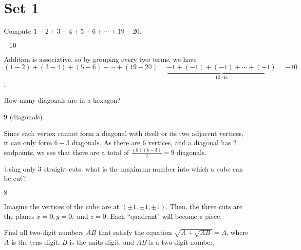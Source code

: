 \documentclass[11pt]{article}
\begin{document}
\section*{Set 1}

\begin{problem}
Compute $1 - 2 + 3 - 4 + 5 - 6 + \cdots + 19 - 20$.
\end{problem}

\begin{answer}
$\boxed{-10}$
\end{answer}

\begin{solution}
Addition is associative, so by grouping every two terms, we have $(1 - 2) + (3 - 4) + (5 - 6) + \cdots + (19 - 20) = \underbrace{-1 + (-1) + (-1) + \cdots + (-1)}_{\text{10 -1s}} = \boxed{-10}$.
\end{solution}


\begin{problem}%
How many diagonals are in a hexagon?
\end{problem}

\begin{answer}
$\boxed{9}$ (diagonals)
\end{answer}

\begin{solution}
Since each vertex cannot form a diagonal with itself or its two adjacent vertices, it can only form $6-3$ diagonals. As there are 6 vertices, and a diagonal has 2 endpoints, we see that there are a total of $\frac{(6)(6-3)}{2}=\boxed{9}$ diagonals.
\end{solution}


\begin{problem}%
Using only 3 straight cuts, what is the maximum number into which a cube can be cut?
\end{problem}

\begin{answer}
$\boxed{8}$
\end{answer}

\begin{solution}
Imagine the vertices of the cube are at $(\pm 1, \pm 1, \pm 1)$. Then, the three cuts are the planes $x=0, y=0,$ and $z=0$. Each ``quadrant" will become a piece.
\end{solution}


\begin{problem}%
Find all two-digit numbers $\underline{AB}$ that satisfy the equation $\sqrt{A + \sqrt{\underline{AB}}} = A$, where $A$ is the tens digit, $B$ is the units digit, and $\underline{AB}$ is a two-digit number.
\end{problem}
\end{document}
